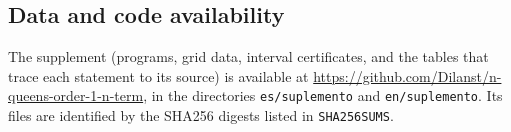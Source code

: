 \subsection{Data and code availability}\label{sec:disponibilidad}
The supplement (programs, grid data, interval certificates, and the tables that trace each statement to
its source) is available at \url{https://github.com/Dilanst/n-queens-order-1-n-term}, in the directories
\texttt{es/suplemento} and \texttt{en/suplemento}. Its files are identified by the SHA256 digests listed
in \texttt{SHA256SUMS}.
